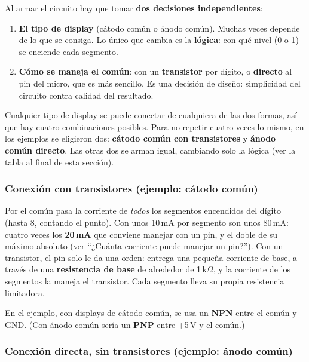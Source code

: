 Al armar el circuito hay que tomar \textbf{dos decisiones independientes}:

\begin{enumerate}
  \item \textbf{El tipo de display} (cátodo común o ánodo común). Muchas veces depende
        de lo que se consiga. Lo único que cambia es la \textbf{lógica}: con qué nivel
        (0 o 1) se enciende cada segmento.
  \item \textbf{Cómo se maneja el común}: con un \textbf{transistor} por dígito, o
        \textbf{directo} al pin del micro, que es más sencillo. Es una decisión de
        diseño: simplicidad del circuito contra calidad del resultado.
\end{enumerate}

Cualquier tipo de display se puede conectar de cualquiera de las dos formas, así que hay
cuatro combinaciones posibles. Para no repetir cuatro veces lo mismo, en los ejemplos se
eligieron dos: \textbf{cátodo común con transistores} y \textbf{ánodo común directo}. Las
otras dos se arman igual, cambiando solo la lógica (ver la tabla al final de esta
sección).

\subsubsection{Conexión con transistores (ejemplo: cátodo común)}

Por el común pasa la corriente de \emph{todos} los segmentos encendidos del dígito (hasta
8, contando el punto). Con unos 10\,mA por segmento son unos 80\,mA: cuatro veces los
\textbf{20\,mA} que conviene manejar con un pin, y el doble de su máximo absoluto (ver
``¿Cuánta corriente puede manejar un pin?''). Con un transistor, el pin solo le da una
orden: entrega una pequeña corriente de base, a través de una \textbf{resistencia de
base} de alrededor de 1\,k$\Omega$, y la corriente de los segmentos la maneja el
transistor. Cada segmento lleva su propia resistencia limitadora.

En el ejemplo, con displays de cátodo común, se usa un \textbf{NPN} entre el común y GND.
(Con ánodo común sería un \textbf{PNP} entre +5\,V y el común.)


\subsubsection{Conexión directa, sin transistores (ejemplo: ánodo común)}

